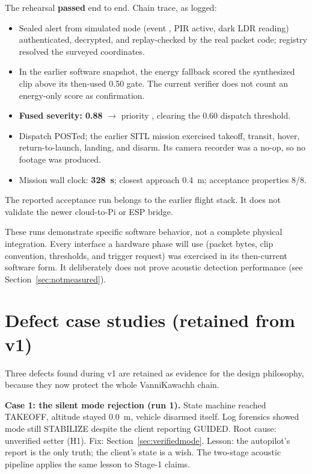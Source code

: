 \documentclass[12pt,a4paper]{report}
\renewcommand{\texttt}[1]{\ifmmode\text{\rmfamily #1}\else{\rmfamily #1}\fi}
\begin{document}
The rehearsal \textbf{passed} end to end. Chain trace, as logged:
\begin{itemize}
\item Sealed alert from simulated node (event \texttt{scream}, PIR
  active, dark LDR reading) authenticated, decrypted, and
  replay-checked by the real packet code; registry resolved the
  surveyed coordinates.
\item In the earlier software snapshot, the energy fallback scored
  the synthesized clip above its then-used 0.50 gate. The current
  verifier does not count an energy-only score as confirmation.
\item \textbf{Fused severity: 0.88} $\rightarrow$ priority
  \texttt{high}, clearing the 0.60 dispatch threshold.
\item Dispatch POSTed; the earlier SITL mission exercised takeoff,
  transit, hover, return-to-launch, landing, and disarm. Its camera
  recorder was a no-op, so no footage was produced.
\item Mission wall clock: \textbf{328~s}; closest approach 0.4~m;
  acceptance properties 8/8.
\end{itemize}

The reported acceptance run belongs to the earlier flight stack. It
does not validate the newer cloud-to-Pi or ESP bridge.

These runs demonstrate specific software behavior, not a complete
physical integration. Every interface a hardware phase will use
(packet bytes, clip convention, thresholds, and trigger request) was
exercised in its then-current software form. It deliberately does
not prove acoustic detection performance (see Section~\ref{sec:notmeasured}).

\section{Defect case studies (retained from v1)}
\label{sec:defects}

Three defects found during v1 are retained as evidence for the design
philosophy, because they now protect the whole VanniKawachh chain.

\textbf{Case 1: the silent mode rejection (run 1).} State machine
reached TAKEOFF, altitude stayed 0.0~m, vehicle disarmed itself. Log
forensics showed mode still STABILIZE despite the client reporting
GUIDED. Root cause: unverified setter (H1). Fix:
Section~\ref{sec:verifiedmode}. Lesson: the autopilot's report is the
only truth; the client's state is a wish. The two-stage acoustic
pipeline applies the same lesson to Stage-1 claims.
\end{document}

